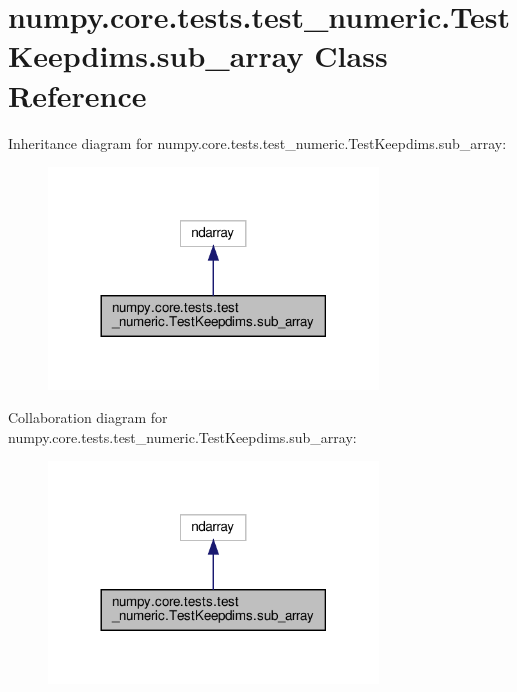 \hypertarget{classnumpy_1_1core_1_1tests_1_1test__numeric_1_1TestKeepdims_1_1sub__array}{}\section{numpy.\+core.\+tests.\+test\+\_\+numeric.\+Test\+Keepdims.\+sub\+\_\+array Class Reference}
\label{classnumpy_1_1core_1_1tests_1_1test__numeric_1_1TestKeepdims_1_1sub__array}


Inheritance diagram for numpy.\+core.\+tests.\+test\+\_\+numeric.\+Test\+Keepdims.\+sub\+\_\+array\+:
\nopagebreak
\begin{figure}[H]
\begin{center}
\leavevmode
\includegraphics[width=248pt]{classnumpy_1_1core_1_1tests_1_1test__numeric_1_1TestKeepdims_1_1sub__array__inherit__graph}
\end{center}
\end{figure}


Collaboration diagram for numpy.\+core.\+tests.\+test\+\_\+numeric.\+Test\+Keepdims.\+sub\+\_\+array\+:
\nopagebreak
\begin{figure}[H]
\begin{center}
\leavevmode
\includegraphics[width=248pt]{classnumpy_1_1core_1_1tests_1_1test__numeric_1_1TestKeepdims_1_1sub__array__coll__graph}
\end{center}
\end{figure}
